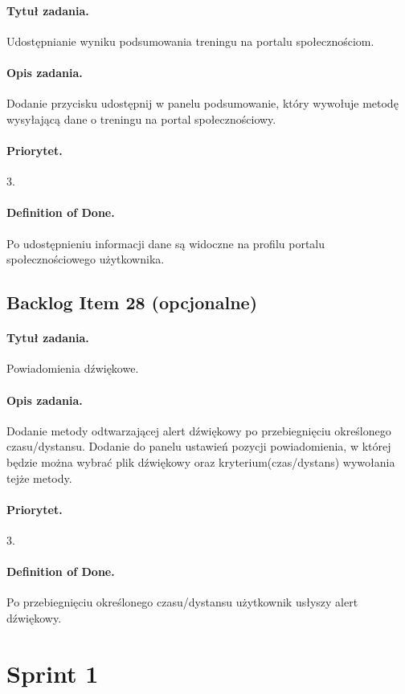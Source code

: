 \documentclass[a4paper]{article}
\begin{document}
\paragraph{Tytuł zadania.} Udostępnianie wyniku podsumowania treningu na portalu społecznościom.
\paragraph{Opis zadania.} Dodanie przycisku udostępnij w panelu podsumowanie, który wywołuje metodę wysyłającą dane o treningu na portal społecznościowy.
\paragraph{Priorytet.} 3.
\paragraph{Definition of Done.} Po udostępnieniu informacji dane są widoczne na profilu portalu społecznościowego użytkownika.

\subsection{Backlog Item 28 (opcjonalne)}
\paragraph{Tytuł zadania.} Powiadomienia dźwiękowe.
\paragraph{Opis zadania.} Dodanie metody odtwarzającej alert dźwiękowy po przebiegnięciu określonego czasu/dystansu. Dodanie do panelu ustawień pozycji powiadomienia, w której będzie można wybrać plik dźwiękowy oraz kryterium(czas/dystans) wywołania tejże metody.
\paragraph{Priorytet.} 3.
\paragraph{Definition of Done.} Po przebiegnięciu określonego czasu/dystansu użytkownik usłyszy alert dźwiękowy.

\section{{Sprint 1}}
\end{document}
